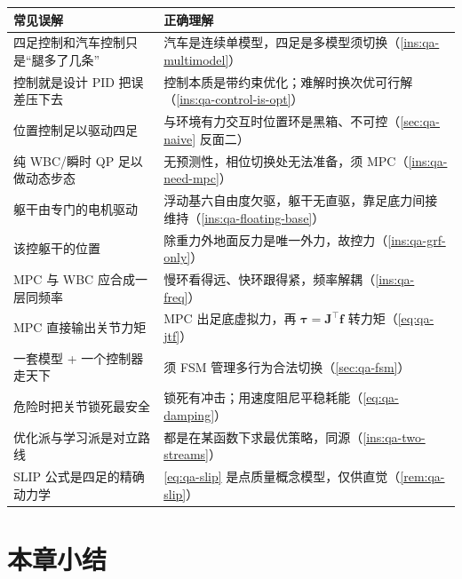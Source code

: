 \begin{table}[H]\centering\small
\begin{tabular}{p{} p{}}
\toprule
\textbf{常见误解} & \textbf{正确理解} \\
\midrule
四足控制和汽车控制只是“腿多了几条” & 汽车是连续单模型，四足是多模型须切换（\cref{ins:qa-multimodel}）\\
控制就是设计 PID 把误差压下去 & 控制本质是带约束优化；难解时换次优可行解（\cref{ins:qa-control-is-opt}）\\
位置控制足以驱动四足 & 与环境有力交互时位置环是黑箱、不可控（\cref{sec:qa-naive} 反面二）\\
纯 WBC/瞬时 QP 足以做动态步态 & 无预测性，相位切换处无法准备，须 MPC（\cref{ins:qa-need-mpc}）\\
躯干由专门的电机驱动 & 浮动基六自由度欠驱，躯干无直驱，靠足底力间接维持（\cref{ins:qa-floating-base}）\\
该控躯干的位置 & 除重力外地面反力是唯一外力，故控力（\cref{ins:qa-grf-only}）\\
MPC 与 WBC 应合成一层同频率 & 慢环看得远、快环跟得紧，频率解耦（\cref{ins:qa-freq}）\\
MPC 直接输出关节力矩 & MPC 出足底虚拟力，再 $\boldsymbol\tau=\mathbf{J}^\top\mathbf{f}$ 转力矩（\cref{eq:qa-jtf}）\\
一套模型 + 一个控制器走天下 & 须 FSM 管理多行为合法切换（\cref{sec:qa-fsm}）\\
危险时把关节锁死最安全 & 锁死有冲击；用速度阻尼平稳耗能（\cref{eq:qa-damping}）\\
优化派与学习派是对立路线 & 都是在某函数下求最优策略，同源（\cref{ins:qa-two-streams}）\\
SLIP 公式是四足的精确动力学 & \cref{eq:qa-slip} 是点质量概念模型，仅供直觉（\cref{rem:qa-slip}）\\
\bottomrule
\end{tabular}
\end{table}

\section*{本章小结}

